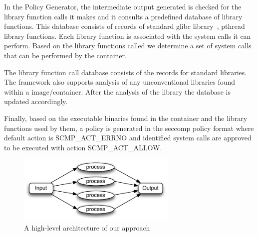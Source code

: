In the Policy Generator, the intermediate output generated is checked for the library function calls it makes and it consults a predefined database of library functions. This database consists of records of standard glibc library~\cite{glibc}, pthread library functions. Each library function is associated with the system calls it can perform. Based on the library functions called we determine a set of system calls that can be performed by the container. 

The library function call database consists of the records for standard libraries. The framework also supports analysis of any unconventional libraries found within a image/container. After the analysis of the library the database is updated accordingly.

Finally, based on the executable binaries found in the container and the library functions used by them, a policy is generated in the seccomp policy format where default action is SCMP\_ACT\_ERRNO and identified system calls are approved to be executed with action SCMP\_ACT\_ALLOW.

\begin{figure}[t]
  \centering
  \includegraphics[width=3in]{figs/overview}
  \caption{A high-level architecture of our approach}
  \label{fig:overview}
\end{figure}


